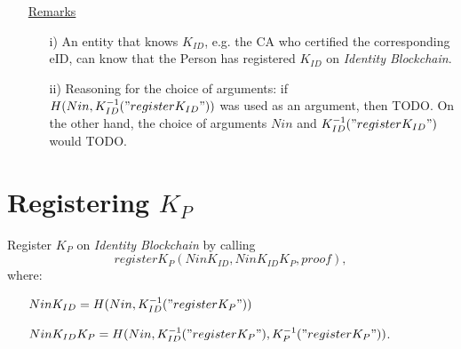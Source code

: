 \documentclass{article}
\newcommand{\khk}{K_{P}}
\newcommand{\kid}{K_{ID}}
\newcommand{\pbc}{\textit{Identity Blockchain}}
\begin{document}
\begin{enumerate}[leftmargin=0cm]
\item[] \underline{Remarks}
\begin{itemize}
\item[i)] An entity that knows $\kid$, e.g. the CA who certified the corresponding eID, can know that the Person has registered $\kid$ on \pbc{}.
\item[ii)] Reasoning for the choice of arguments: if $H(Nin, \kid^{-1}("register\kid"))$ was used as an argument, then TODO. On the other hand, the choice of arguments $Nin$ and $\kid^{-1}("register\kid")$ would TODO.
\end{itemize}
\end{enumerate}

\newpage
\section{Registering $\khk$}
Register $\khk$ on \pbc{} by calling $$register\khk(Nin\kid, Nin\kid\khk, proof),$$
  where:
    \begin{enumerate}
      \item[] $Nin\kid=H(Nin,\kid^{-1}("register\khk"))$
      \item[] $Nin\kid\khk=H(Nin, \kid^{-1}("register\khk"), \khk^{-1}("register\khk"))$.
    \end{enumerate}
\end{document}
